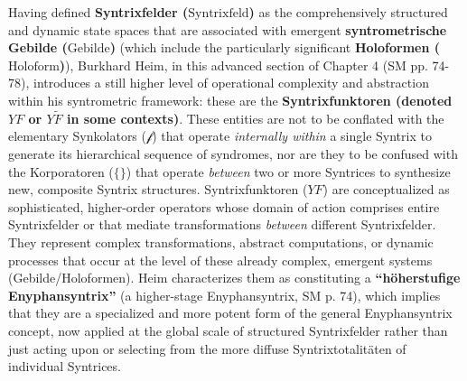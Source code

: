 \documentclass[12pt]{article}
\newcommand{\q}[1]{\enquote{#1}}
\newcommand{\synkolator}{\mathcal{f}}
\newcommand{\syntrixfeld}{\text{Syntrixfeld}}
\newcommand{\syntrometrischesGebilde}{\text{Gebilde}}
\newcommand{\holoform}{\text{Holoform}}
\newcommand{\syntrixfunktor}{YF}
\begin{document}
Having defined \textbf{Syntrixfelder (\(\syntrixfeld\))} as the comprehensively structured and dynamic state spaces that are associated with emergent \textbf{syntrometrische Gebilde (\(\syntrometrischesGebilde\))} (which include the particularly significant \textbf{Holoformen (\(\holoform\))}), Burkhard Heim, in this advanced section of Chapter 4 (SM pp. 74-78), introduces a still higher level of operational complexity and abstraction within his syntrometric framework: these are the \textbf{Syntrixfunktoren (denoted \( \syntrixfunktor \) or \( Y\tilde{F} \) in some contexts)}. These entities are not to be conflated with the elementary Synkolators (\( \synkolator \)) that operate \textit{internally within} a single Syntrix to generate its hierarchical sequence of syndromes, nor are they to be confused with the Korporatoren (\( \{ \} \)) that operate \textit{between} two or more Syntrices to synthesize new, composite Syntrix structures. Syntrixfunktoren (\(\syntrixfunktor\)) are conceptualized as sophisticated, higher-order operators whose domain of action comprises entire Syntrixfelder or that mediate transformations \textit{between} different Syntrixfelder. They represent complex transformations, abstract computations, or dynamic processes that occur at the level of these already complex, emergent systems (Gebilde/Holoformen). Heim characterizes them as constituting a \textbf{\q{höherstufige Enyphansyntrix}} (a higher-stage Enyphansyntrix, SM p. 74), which implies that they are a specialized and more potent form of the general Enyphansyntrix concept, now applied at the global scale of structured Syntrixfelder rather than just acting upon or selecting from the more diffuse Syntrixtotalitäten of individual Syntrices.
\end{document}
